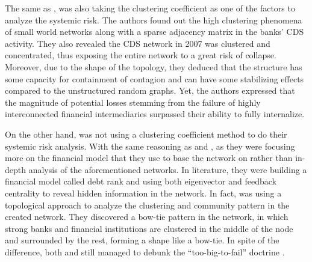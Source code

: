 \documentclass[a4paper,11pt]{article}
\begin{document}
The same as \cite{Lai_Hu_2021}, \cite{Markose_Giansante_Shaghaghi_2012} was also taking the clustering coefficient as one of the factors to analyze the systemic risk. The authors found out the high clustering phenomena of small world networks along with a sparse adjacency matrix in the banks’ CDS activity. They also revealed the CDS network in 2007 was clustered and concentrated, thus exposing the entire network to a great risk of collapse. Moreover, due to the shape of the topology, they deduced that the structure has some capacity for containment of contagion and can have some stabilizing effects compared to the unstructured random graphs. Yet, the authors expressed that the magnitude of potential losses stemming from the failure of highly interconnected financial intermediaries surpassed their ability to fully internalize.

On the other hand, \cite{Battiston_Puliga_Kaushik_Tasca_Caldarelli_2012} was not using a clustering coefficient method to do their systemic risk analysis. With the same reasoning as \cite{Duan_El_Ghoul_Guedhami_Li_Li_2020} and \cite{Zhang_Yin_Sha_2023}, as they  were focusing more on the financial model that they use to base the network on rather than in-depth analysis of the aforementioned networks. In \cite{Battiston_Puliga_Kaushik_Tasca_Caldarelli_2012} literature, they were building a financial model called debt rank and using both eigenvector and feedback centrality to reveal hidden information in the network. In fact, \cite{Battiston_Puliga_Kaushik_Tasca_Caldarelli_2012} was using a topological approach to analyze the clustering and community pattern in the created network. They discovered a bow-tie pattern in the network, in which strong banks and financial institutions are clustered in the middle of the node and surrounded by the rest, forming a shape like a bow-tie. In spite of the difference, both \cite{Markose_Giansante_Shaghaghi_2012} and \cite{Battiston_Puliga_Kaushik_Tasca_Caldarelli_2012} still managed to debunk the “too-big-to-fail” doctrine \citep{Zhou_2009}.
\end{document}
